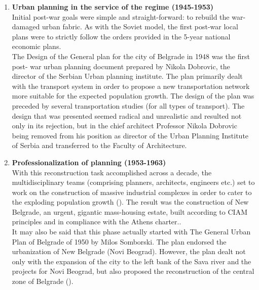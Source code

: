 \documentclass[11pt]{report}
\begin{document}
\begin{enumerate}
\item \textbf{Urban planning in the service of the regime  (1945-1953)}
\\
Initial post-war goals were simple and straight-forward: to rebuild the war-damaged urban fabric. As with the Soviet model, the first post-war local plans were to strictly follow the orders provided in the 5-year national economic plans. 
\\

The Design of the General plan for the city of Belgrade in 1948 was the first post- war urban planning document prepared by Nikola Dobrovic, the director of the Serbian Urban planning institute. The plan primarily dealt with the transport system in order to propose a new transportation network more suitable for the expected population growth. The design of the plan was preceded by several transportation studies (for all types of transport). The  design that was presented seemed radical and unrealistic and resulted not only in its rejection, but in the chief architect Professor Nikola Dobrovic being removed from his position as director of the Urban Planning Institute of Serbia and transferred to the Faculty of Architecture.

\item \textbf{Professionalization of planning (1953-1963)}
\\
With this reconstruction task accomplished across a decade, the multidisciplinary teams (comprising planners, architects, engineers etc.) set to work on the construction of massive industrial complexes in order to cater to the exploding population growth (\href{Hirt}{\citealt{hirt_belgrade_2009}}). The result was the construction of New Belgrade, an urgent, gigantic mass-housing estate, built according to CIAM principles and in compliance with the Athens charter..
\\
It may also be said that this phase actually started with The General Urban Plan of Belgrade of 1950 by Milos Somborski. The plan endorsed the urbanization of New Belgrade (Novi Beograd). However, the plan dealt not only with the expansion of the city to the left bank of the Sava river and the projects for Novi Beograd, but also proposed the reconstruction of the central zone of Belgrade (\href{Grozdanic}{\citealt{grozdanic_belgrade_2008}}).


\end{enumerate}
\end{document}
